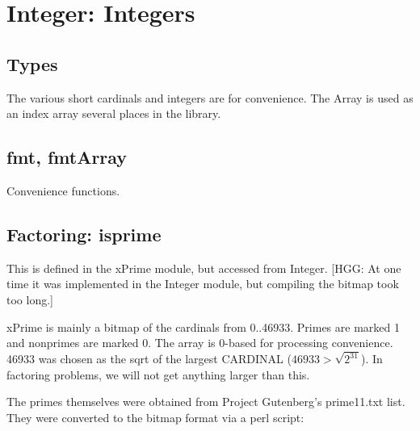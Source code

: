 \section{Integer: Integers}

\subsection*{Types}
The various short cardinals and integers are for convenience.  The
Array is used as an index array several places in the library.

\subsection*{fmt, fmtArray}
Convenience functions.

\subsection*{Factoring: isprime}
This is defined in the xPrime module, but accessed from Integer.  [HGG: At one
time it was implemented in the Integer module, but compiling the
bitmap took too long.]

xPrime is mainly a bitmap of the cardinals from
0..46933.  Primes are marked 1 and nonprimes are marked 0.  The array is
0-based for processing convenience.  46933 was chosen as the sqrt of
the largest CARDINAL ($46933 > \sqrt{2^{31}}$).  In factoring problems,
we will not get anything larger than this.

The primes themselves were obtained from Project Gutenberg's prime11.txt
list.  They were converted to the bitmap format via a perl script:

